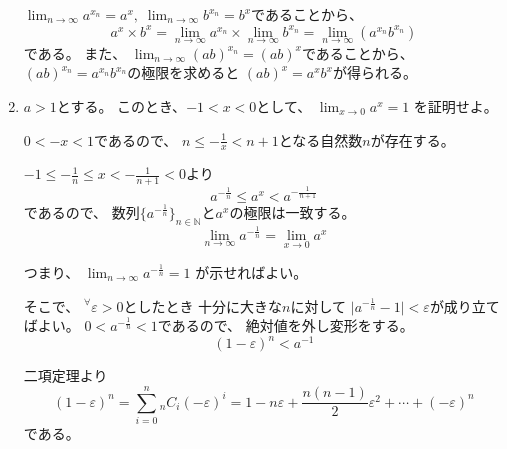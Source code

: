 \documentclass[12pt,b5paper]{ltjsarticle}
\begin{document}
\begin{enumerate}
      $\displaystyle \lim_{n\to\infty}a^{x_{n}}=a^{x},\; \lim_{n\to\infty}b^{x_{n}}=b^{x}$であることから、
      \begin{equation}
       a^{x} \times b^{x}
        =
       \lim_{n\to\infty}a^{x_{n}} \times \lim_{n\to\infty}b^{x_{n}}
       =
       \lim_{n\to\infty} (a^{x_{n}} b^{x_{n}})
      \end{equation}
      である。
      また、
      $\displaystyle \lim_{n\to\infty}(ab)^{x_{n}}=(ab)^{x}$であることから、
      $(ab)^{x_{n}}=a^{x_{n}}b^{x_{n}}$の極限を求めると
      $(ab)^{x}=a^{x}b^{x}$が得られる。

      \hrulefill

 \item
      $a>1$とする。
      このとき、$-1 < x < 0$として、
      $\displaystyle \lim_{x\to 0} a^{x} = 1$
      を証明せよ。

      \dotfill

      $0<-x<1$であるので、
      $n\leq -\frac{1}{x} <n+1$となる自然数$n$が存在する。

      $-1 \leq -\frac{1}{n} \leq x < -\frac{1}{n+1} <0$より
      \begin{equation}
       a^{-\frac{1}{n}} \leq a^{x} < a^{-\frac{1}{n+1}}
      \end{equation}
      であるので、
      数列$\{a^{-\frac{1}{n}}\}_{n\in\mathbb{N}}$と$a^{x}$の極限は一致する。
      \begin{equation}
       \lim_{n\to\infty}a^{-\frac{1}{n}}
        =\lim_{x\to 0} a^{x}
      \end{equation}

      つまり、
      $\displaystyle \lim_{n\to\infty} a^{-\frac{1}{n}}=1$
      が示せればよい。

      そこで、
      ${}^{\forall}\varepsilon > 0$としたとき
      十分に大きな$n$に対して
      $\lvert a^{-\frac{1}{n}} -1 \rvert < \varepsilon$が成り立てばよい。
      $0 < a^{-\frac{1}{n}} <1$であるので、
      絶対値を外し変形をする。
      \begin{equation}
       (1-\varepsilon)^{n} < a^{-1}
      \end{equation}

      二項定理より
      \begin{equation}
       (1-\varepsilon)^{n}
       = \sum_{i=0}^{n} {}_{n}C_{i}(-\varepsilon)^{i}
       =1 - n\varepsilon + \frac{n(n-1)}{2}\varepsilon^{2} +
       \cdots
       + (-\varepsilon)^{n}
      \end{equation}
      である。


\end{enumerate}
\end{document}
